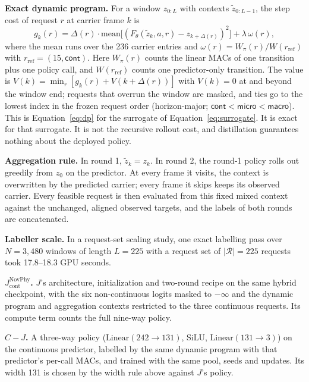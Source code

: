 \begin{revblock}
\textbf{Exact dynamic program.} For a window $z_{0:L}$ with contexts $\tilde z_{0:L-1}$, the step cost of request $r$ at carrier frame $k$ is
\begin{equation*}
g_k(r)=\Delta(r)\cdot\mathrm{mean}\big[(F_\theta(\tilde z_k,a,r)-z_{k+\Delta(r)})^2\big]+\lambda\,\omega(r),
\end{equation*}
where the mean runs over the 236 carrier entries and $\omega(r)=W_\pi(r)/W(r_{\mathrm{ref}})$ with $r_{\mathrm{ref}}=(15,\textsf{cont})$. Here $W_\pi(r)$ counts the linear MACs of one transition plus one policy call, and $W(r_{\mathrm{ref}})$ counts one predictor-only transition. The value is $V(k)=\min_r[g_k(r)+V(k+\Delta(r))]$ with $V(k)=0$ at and beyond the window end; requests that overrun the window are masked, and ties go to the lowest index in the frozen request order (horizon-major; $\textsf{cont}<\textsf{micro}<\textsf{macro}$). This is Equation~\ref{eq:dp} for the surrogate of Equation~\ref{eq:surrogate}. It is exact for that surrogate. It is not the recursive rollout cost, and distillation guarantees nothing about the deployed policy.

\textbf{Aggregation rule.} In round 1, $\tilde z_k=z_k$. In round 2, the round-1 policy rolls out greedily from $z_0$ on the predictor. At every frame it visits, the context is overwritten by the predicted carrier; every frame it skips keeps its observed carrier. Every feasible request is then evaluated from this fixed mixed context against the unchanged, aligned observed targets, and the labels of both rounds are concatenated.

\textbf{Labeller scale.} In a request-set scaling study, one exact labelling pass over $N=3{,}480$ windows of length $L=225$ with a request set of $|\mathcal{R}|=225$ requests took 17.8--18.3 GPU seconds.

\textbf{$J_{\mathrm{cont}}^{\mathrm{NovPhy}}$.} $J$'s architecture, initialization and two-round recipe on the same hybrid checkpoint, with the six non-continuous logits masked to $-\infty$ and the dynamic program and aggregation contexts restricted to the three continuous requests. Its compute term counts the full nine-way policy.

\textbf{$C\!-\!J$.} A three-way policy ($\mathrm{Linear}(242\to131)$, SiLU, $\mathrm{Linear}(131\to3)$) on the continuous predictor, labelled by the same dynamic program with that predictor's per-call MACs, and trained with the same pool, seeds and updates. Its width 131 is chosen by the width rule above against $J$'s policy.


\end{revblock}
